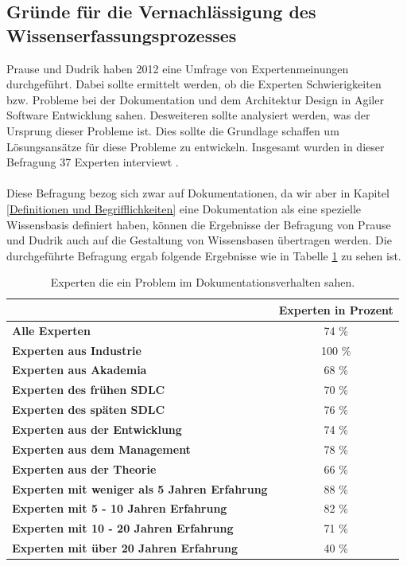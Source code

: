 \documentclass[a4paper,12pt,twoside]{scrartcl}
\begin{document}
\subsection{Gründe für die Vernachlässigung des Wissenserfassungsprozesses}
Prause und Dudrik haben 2012 eine Umfrage von Expertenmeinungen durchgeführt. Dabei sollte ermittelt werden, ob die Experten Schwierigkeiten bzw. Probleme bei der Dokumentation und dem Architektur Design in Agiler Software Entwicklung sahen. Desweiteren sollte analysiert werden, was der Ursprung dieser Probleme ist. Dies sollte die Grundlage schaffen um Lösungsansätze für diese Probleme zu entwickeln. Insgesamt wurden in dieser Befragung 37 Experten interviewt \cite{Prause2012}.
\\\\
Diese Befragung bezog sich zwar auf Dokumentationen, da wir aber in Kapitel \ref{Definitionen und Begrifflichkeiten} eine Dokumentation als eine spezielle Wissensbasis definiert haben, können die Ergebnisse der Befragung von Prause und Dudrik auch auf die Gestaltung von Wissensbasen übertragen werden. Die durchgeführte Befragung ergab folgende Ergebnisse wie in Tabelle \ref{ProblemTabelle} zu sehen ist.
\begin{table}[htb]
\begin{tabular}{|l|c|}\hline
\rule{0pt}{15pt}  & \textbf{Experten in Prozent}
\\
\hline
\rule{0pt}{15pt} \textbf{Alle Experten} & 74 \%\\ 
\hline
\rule{0pt}{15pt} \textbf{Experten aus Industrie} & 100 \% \\
\hline
\rule{0pt}{15pt} \textbf{Experten aus Akademia} & 68 \%\\
\hline
\rule{0pt}{15pt} \textbf{Experten des frühen SDLC} & 70 \%\\
\hline
\rule{0pt}{15pt} \textbf{Experten des späten SDLC} & 76 \%\\
\hline
\rule{0pt}{15pt} \textbf{Experten aus der Entwicklung} & 74 \%\\
\hline
\rule{0pt}{15pt} \textbf{Experten aus dem Management} & 78 \%\\
\hline
\rule{0pt}{15pt} \textbf{Experten aus der Theorie} & 66 \%\\
\hline
\rule{0pt}{15pt} \textbf{Experten mit weniger als 5 Jahren Erfahrung} & 88 \%\\
\hline
\rule{0pt}{15pt} \textbf{Experten mit 5 - 10 Jahren Erfahrung} & 82 \%\\
\hline
\rule{0pt}{15pt} \textbf{Experten mit 10 - 20 Jahren Erfahrung} & 71 \%\\
\hline
\rule{0pt}{15pt} \textbf{Experten mit über 20 Jahren Erfahrung} & 40 \%\\
\hline
\end{tabular}
\caption{Experten die ein Problem im Dokumentationsverhalten sahen.}
\label{ProblemTabelle}
\end{table}
\end{document}
